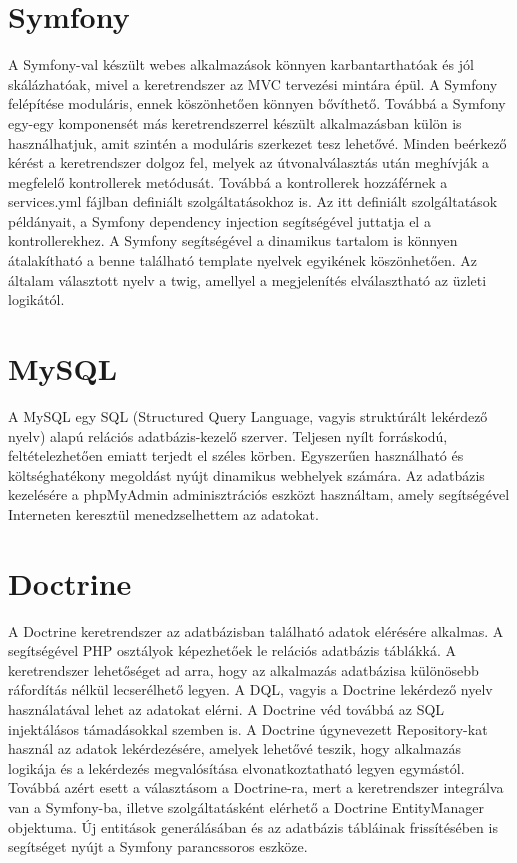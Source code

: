 \section*{Symfony}
A Symfony-val készült webes alkalmazások könnyen karbantarthatóak és jól skálázhatóak, mivel a keretrendszer az MVC tervezési mintára épül.
A Symfony felépítése moduláris, ennek köszönhetően könnyen bővíthető.
Továbbá a Symfony egy-egy komponensét más keretrendszerrel készült alkalmazásban külön is használhatjuk, amit szintén a moduláris szerkezet tesz lehetővé.
Minden beérkező kérést a keretrendszer dolgoz fel, melyek az útvonalválasztás után meghívják a megfelelő kontrollerek metódusát.
Továbbá a kontrollerek hozzáférnek a services.yml fájlban definiált szolgáltatásokhoz is.
Az itt definiált szolgáltatások példányait, a Symfony dependency injection segítségével juttatja el a kontrollerekhez.
A Symfony segítségével a dinamikus tartalom is könnyen átalakítható a benne található template nyelvek egyikének köszönhetően.
Az általam választott nyelv a twig, amellyel a megjelenítés elválasztható az üzleti logikától. %

\section*{MySQL}
A MySQL  egy SQL (Structured Query Language, vagyis struktúrált lekérdező nyelv) alapú relációs adatbázis-kezelő szerver.
Teljesen nyílt forráskodú, feltételezhetően emiatt terjedt el széles körben.
Egyszerűen használható és költséghatékony megoldást nyújt dinamikus webhelyek számára.
Az adatbázis kezelésére a phpMyAdmin adminisztrációs eszközt használtam, amely segítségével Interneten keresztül menedzselhettem az adatokat.

\section*{Doctrine}
A Doctrine keretrendszer az adatbázisban található adatok elérésére alkalmas.
A segítségével PHP osztályok képezhetőek le relációs adatbázis táblákká.
A keretrendszer lehetőséget ad arra, hogy az alkalmazás adatbázisa különösebb ráfordítás nélkül lecserélhető legyen.
A DQL, vagyis a Doctrine lekérdező nyelv használatával lehet az adatokat elérni.
A Doctrine véd továbbá az SQL injektálásos támadásokkal szemben is.
A Doctrine úgynevezett Repository-kat használ az adatok lekérdezésére, amelyek lehetővé teszik, hogy alkalmazás logikája és a lekérdezés megvalósítása elvonatkoztatható legyen egymástól.
Továbbá azért esett a választásom a Doctrine-ra, mert a keretrendszer integrálva van a Symfony-ba, illetve szolgáltatásként elérhető a Doctrine EntityManager objektuma.
Új entitások generálásában és az adatbázis tábláinak frissítésében is segítséget nyújt a Symfony parancssoros eszköze.













